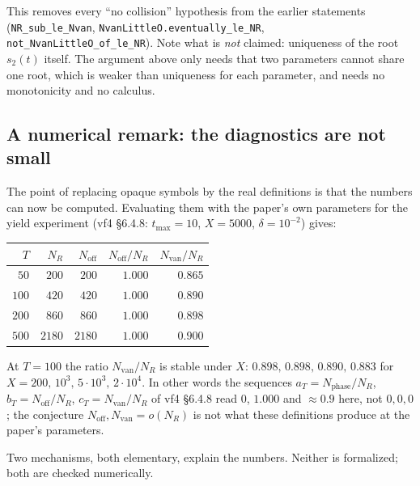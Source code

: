 \documentclass[11pt,a4paper]{article}
\newcommand{\lb}{\_\allowbreak}
\newcommand{\code}[1]{\texttt{#1}}
\theoremstyle{definition}
\theoremstyle{remark}
\begin{document}
\noindent
This removes every ``no collision'' hypothesis from the earlier statements
(\code{NR\lb sub\lb le\lb Nvan}, \code{NvanLittleO.eventually\lb le\lb NR},
\code{not\lb NvanLittleO\lb of\lb le\lb NR}).  Note what is \emph{not} claimed: uniqueness of the
root $s_2(t)$ itself.  The argument above only needs that two parameters cannot share one root,
which is weaker than uniqueness for each parameter, and needs no monotonicity and no calculus.

\subsection{A numerical remark: the diagnostics are not small}\label{sec:eigen-num}

The point of replacing opaque symbols by the real definitions is that the numbers can now be
computed.  Evaluating them with the paper's own parameters for the yield experiment
(vf4 \S6.4.8: $t_{\max}=10$, $X=5000$, $\delta=10^{-2}$) gives:

\begin{center}
\small
\begin{tabular}{rrrrr}
\toprule
$T$ & $N_R$ & $N_{\mathrm{off}}$ & $N_{\mathrm{off}}/N_R$ & $N_{\mathrm{van}}/N_R$\\
\midrule
$50$  & $200$  & $200$  & $1.000$ & $0.865$\\
$100$ & $420$  & $420$  & $1.000$ & $0.890$\\
$200$ & $860$  & $860$  & $1.000$ & $0.898$\\
$500$ & $2180$ & $2180$ & $1.000$ & $0.900$\\
\bottomrule
\end{tabular}
\end{center}

\noindent
At $T=100$ the ratio $N_{\mathrm{van}}/N_R$ is stable under $X$: $0.898,\,0.898,\,0.890,\,0.883$
for $X=200,\,10^3,\,5\cdot10^3,\,2\cdot10^4$.  In other words the sequences
$a_T=N_{\mathrm{phase}}/N_R$, $b_T=N_{\mathrm{off}}/N_R$, $c_T=N_{\mathrm{van}}/N_R$ of
vf4 \S6.4.8 read $0$, $1.000$ and $\approx0.9$ here, not $0,0,0$; the conjecture
$N_{\mathrm{off}},N_{\mathrm{van}}=o(N_R)$ is not what these definitions produce at the
paper's parameters.

Two mechanisms, both elementary, explain the numbers.  Neither is formalized; both are
checked numerically.
\end{document}

